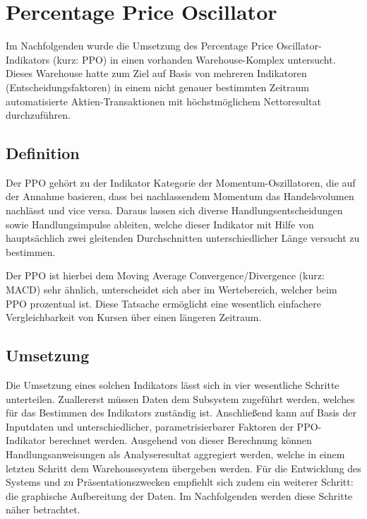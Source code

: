 

\section{Percentage Price Oscillator}

Im Nachfolgenden wurde die Umsetzung des Percentage Price Oscillator-Indikators (kurz: PPO) in einen vorhanden Warehouse-Komplex untersucht. Dieses Warehouse hatte zum Ziel auf Basis von mehreren Indikatoren (Entscheidungsfaktoren) in einem nicht genauer bestimmten Zeitraum automatisierte Aktien-Transaktionen mit höchstmöglichem Nettoresultat durchzuführen.

\subsection{Definition}
Der PPO gehört zu der Indikator Kategorie der Momentum-Oszil\-latoren, die auf der Annahme basieren, dass bei nachlassendem Momentum das Handelsvolumen nachlässt und vice versa. Daraus lassen sich diverse Handlungsentscheidungen sowie Handlungsimpulse ableiten, welche dieser Indikator mit Hilfe von hauptsächlich zwei gleitenden Durchschnitten unterschiedlicher Länge versucht zu bestimmen. \cite{tvWikiPpo,inoPedPpo}

Der PPO ist hierbei dem Moving Average Convergence/Divergence (kurz: MACD) sehr ähnlich, unterscheidet sich aber im Wertebereich, welcher beim PPO prozentual ist. Diese Tatsache ermöglicht eine wesentlich einfachere Vergleichbarkeit von Kursen über einen längeren Zeitraum.\cite{tvWikiMacd}

\subsection{Umsetzung}
Die Umsetzung eines solchen Indikators lässt sich in vier wesentliche Schritte unterteilen. Zuallererst müssen Daten dem Subsystem zugeführt werden, welches für das Bestimmen des Indikators zuständig ist. Anschließend kann auf Basis der Inputdaten und unterschiedlicher, parametrisierbarer Faktoren der PPO-Indikator berechnet werden. Ausgehend von dieser Berechnung können Handlungsanweisungen als Analyseresultat aggregiert werden, welche in einem letzten Schritt dem Warehousesystem übergeben werden. Für die Entwicklung des Systems und zu Präsentationszwecken empfiehlt sich zudem ein weiterer Schritt: die graphische Aufbereitung der Daten. Im Nachfolgenden werden diese Schritte näher betrachtet.

